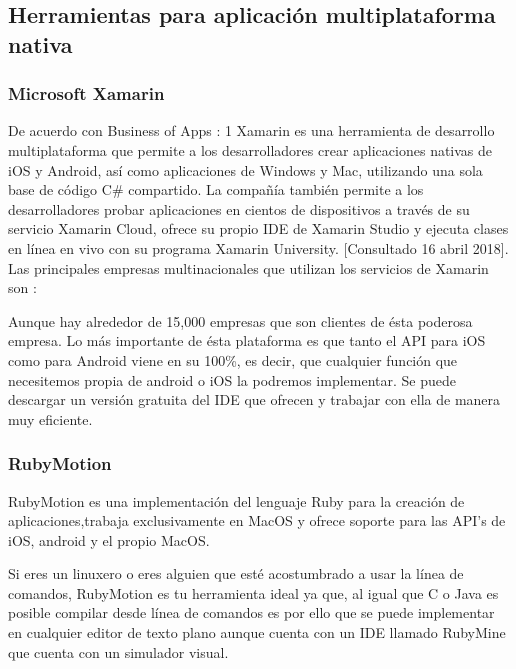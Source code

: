 \documentclass[a4paper,12pt]{mylib/publicacion}
\begin{document}
\subsection{Herramientas para aplicación multiplataforma nativa}

\subsubsection{Microsoft Xamarin}

De acuerdo con Business of Apps :
1
Xamarin es una herramienta de desarrollo multiplataforma que permite a los
desarrolladores crear aplicaciones nativas de iOS y Android, así como
aplicaciones de Windows y Mac, utilizando una sola base de código C\#
compartido. La compañía también permite a los desarrolladores probar
aplicaciones en cientos de dispositivos a través de su servicio Xamarin Cloud, ofrece su propio IDE de Xamarin Studio y ejecuta clases en línea en vivo con su programa Xamarin University. [Consultado 16 abril 2018].
Las principales empresas multinacionales que utilizan los servicios de Xamarin son :


Aunque hay alrededor de 15,000 empresas que son clientes de ésta poderosa empresa.
Lo más importante de ésta plataforma es que tanto el API para iOS como para Android viene en su 100\%, es decir, que cualquier función que necesitemos propia de android o iOS la podremos implementar.
Se puede descargar un versión gratuita del IDE que ofrecen y trabajar con ella de manera muy eficiente.

\subsubsection{RubyMotion}

RubyMotion es una implementación del lenguaje Ruby para la creación de aplicaciones,trabaja exclusivamente en MacOS y ofrece soporte para las API’s de iOS, android y el propio MacOS.

Si eres un linuxero o eres alguien que esté acostumbrado a usar la línea de comandos, RubyMotion es tu herramienta ideal ya que, al igual que C o Java es posible compilar desde línea de comandos es por ello que se puede implementar en cualquier editor de texto plano aunque cuenta con un IDE llamado RubyMine que cuenta con un simulador visual.
\end{document}
